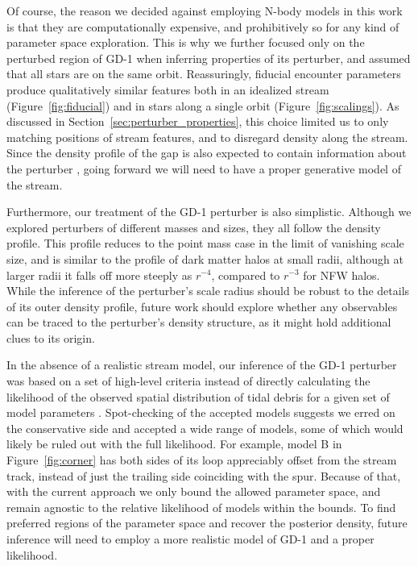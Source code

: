 \documentclass[twocolumn]{aastex62}
\begin{document}
Of course, the reason we decided against employing N-body models in this work is that they are computationally expensive, and prohibitively so for any kind of parameter space exploration.
This is why we further focused only on the perturbed region of GD-1 when inferring properties of its perturber, and assumed that all stars are on the same orbit.
Reassuringly, fiducial encounter parameters produce qualitatively similar features both in an idealized stream (Figure~\ref{fig:fiducial}) and in stars along a single orbit (Figure~\ref{fig:scalings}).
As discussed in Section~\ref{sec:perturber_properties}, this choice limited us to only matching positions of stream features, and to disregard density along the stream.
Since the density profile of the gap is also expected to contain information about the perturber \citep{eb2015b}, going forward we will need to have a proper generative model of the stream.

Furthermore, our treatment of the GD-1 perturber is also simplistic.
Although we explored perturbers of different masses and sizes, they all follow the \citet{hernquist1990} density profile.
This profile reduces to the point mass case in the limit of vanishing scale size, and is similar to the profile of dark matter halos \citep[NFW,][]{navarro1997} at small radii, although at larger radii it falls off more steeply as $r^{-4}$, compared to $r^{-3}$ for NFW halos.
While the inference of the perturber's scale radius should be robust to the details of its outer density profile, future work should explore whether any observables can be traced to the perturber's density structure, as it might hold additional clues to its origin.

In the absence of a realistic stream model, our inference of the GD-1 perturber was based on a set of high-level criteria instead of directly calculating the likelihood of the observed spatial distribution of tidal debris for a given set of model parameters \citep[e.g., likelihood developed in][]{bonaca2014}.
Spot-checking of the accepted models suggests we erred on the conservative side and accepted a wide range of models, some of which would likely be ruled out with the full likelihood.
For example, model B in Figure~\ref{fig:corner} has both sides of its loop appreciably offset from the stream track, instead of just the trailing side coinciding with the spur.
Because of that, with the current approach we only bound the allowed parameter space, and remain agnostic to the relative likelihood of models within the bounds.
To find preferred regions of the parameter space and recover the posterior density, future inference will need to employ a more realistic model of GD-1 and a proper likelihood.
\end{document}
